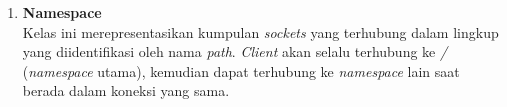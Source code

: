 \begin{enumerate}
\begin{itemize}
			
%			
			
%	
%	
		
			
		\end{itemize}

	\item \textbf{Namespace} \\ 
	Kelas ini merepresentasikan kumpulan \textit{sockets} yang terhubung dalam lingkup yang diidentifikasi oleh nama \textit{path}. \textit{Client} akan selalu terhubung ke \textit{/} (\textit{namespace} utama), kemudian dapat terhubung ke \textit{namespace} lain saat berada dalam koneksi yang sama.
	

\end{enumerate}
